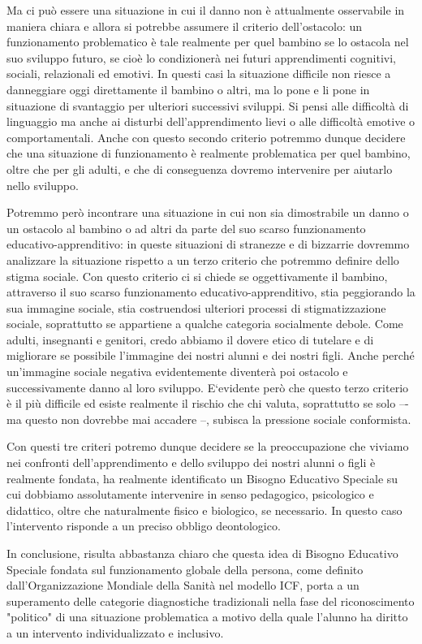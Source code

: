 Ma ci può essere una situazione in cui il danno non è attualmente osservabile in maniera
chiara e allora si potrebbe assumere il criterio dell'ostacolo: un funzionamento problematico è tale
realmente per quel bambino se lo ostacola nel suo sviluppo futuro, se cioè lo condizionerà nei
futuri apprendimenti cognitivi, sociali, relazionali ed emotivi. In questi casi la situazione difficile
non riesce a danneggiare oggi direttamente il bambino o altri, ma lo pone e li pone in situazione di
svantaggio per ulteriori successivi sviluppi. Si pensi alle difficoltà di linguaggio ma anche ai disturbi
dell'apprendimento lievi o alle difficoltà emotive o comportamentali. Anche con questo secondo
criterio potremmo dunque decidere che una situazione di funzionamento è realmente
problematica per quel bambino, oltre che per gli adulti, e che di conseguenza dovremo intervenire
per aiutarlo nello sviluppo.

Potremmo però incontrare una situazione in cui non sia dimostrabile un danno o un ostacolo
al bambino o ad altri da parte del suo scarso funzionamento educativo-apprenditivo: in queste
situazioni di stranezze e di bizzarrie dovremmo analizzare la situazione rispetto a un terzo criterio
che potremmo definire dello stigma sociale. Con questo criterio ci si chiede se oggettivamente il
bambino, attraverso il suo scarso funzionamento educativo-apprenditivo, stia peggiorando la sua
immagine sociale, stia costruendosi ulteriori processi di stigmatizzazione sociale, soprattutto se
appartiene a qualche categoria socialmente debole. Come adulti, insegnanti e genitori, credo
abbiamo il dovere etico di tutelare e di migliorare se possibile l'immagine dei nostri alunni e dei
nostri figli. Anche perché un'immagine sociale negativa evidentemente diventerà poi ostacolo e
successivamente danno al loro sviluppo. E`evidente però che questo terzo criterio è il più difficile
ed esiste realmente il rischio che chi valuta, soprattutto se solo –- ma questo non dovrebbe mai
accadere --, subisca la pressione sociale conformista.

Con questi tre criteri potremo dunque decidere se la preoccupazione che viviamo nei
confronti dell'apprendimento e dello sviluppo dei nostri alunni o figli è realmente fondata, ha
realmente identificato un Bisogno Educativo Speciale su cui dobbiamo assolutamente intervenire
in senso pedagogico, psicologico e didattico, oltre che naturalmente fisico e biologico, se
necessario. In questo caso l'intervento risponde a un preciso obbligo deontologico.

In conclusione, risulta abbastanza chiaro che questa idea di Bisogno Educativo Speciale
fondata sul funzionamento globale della persona, come definito dall'Organizzazione Mondiale
della Sanità nel modello ICF, porta a un superamento delle categorie diagnostiche tradizionali nella
fase del riconoscimento "politico" di una situazione problematica a motivo della quale l'alunno ha
diritto a un intervento individualizzato e inclusivo.

